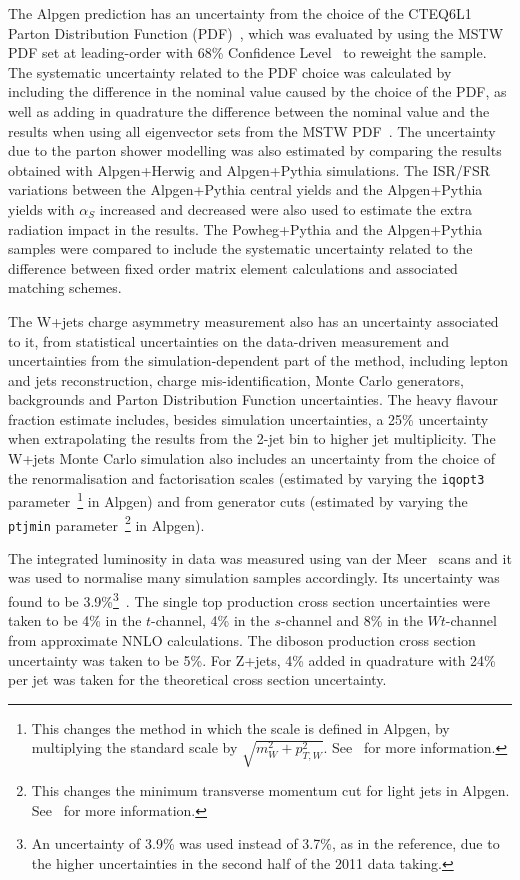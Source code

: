The Alpgen \ttbar prediction has an uncertainty from the choice of the CTEQ6L1 Parton Distribution Function (PDF)~\cite{cteq6}, which was
evaluated by using the MSTW PDF set at leading-order with 68\% Confidence Level~\cite{mstw,pdflhc}
to reweight the \ttbar sample. The systematic uncertainty related to the PDF choice was calculated by
including the difference in the nominal value caused by the choice of the PDF, as well as adding in quadrature the difference between the nominal value and the
results when using all eigenvector sets from the MSTW PDF~\cite{pdflhc}. The uncertainty due to the parton shower modelling was also estimated by comparing the
results obtained with Alpgen+Herwig and Alpgen+Pythia \ttbar simulations. The ISR/FSR variations between the Alpgen+Pythia central yields and the
Alpgen+Pythia yields with $\alpha_S$ increased and
decreased were also used to estimate the extra radiation impact in the results.
The Powheg+Pythia and the Alpgen+Pythia \ttbar samples were compared to include the systematic uncertainty related to the difference
between fixed order matrix element calculations and associated matching schemes.

The W+jets charge asymmetry measurement also has an uncertainty associated to it, from statistical uncertainties on the data-driven measurement and uncertainties
from the simulation-dependent part of the method, including lepton and jets reconstruction, charge mis-identification, Monte Carlo generators, backgrounds and
Parton Distribution Function uncertainties. The heavy flavour fraction estimate includes, besides simulation uncertainties, a 25\% uncertainty when extrapolating the results
from the 2-jet bin to higher jet multiplicity. The W+jets Monte Carlo simulation also includes an uncertainty from the choice of the renormalisation and factorisation scales
(estimated by varying the \texttt{iqopt3} parameter~\footnote{This changes the method in which the scale is defined in Alpgen, by multiplying the standard scale by $\sqrt{m_W^2 + p_{T,W}^2}$. See~\cite{alpgen} for more information.} in Alpgen) and from generator cuts (estimated by varying the \texttt{ptjmin} parameter~\footnote{This changes the minimum transverse momentum cut for light jets in Alpgen. See~\cite{alpgen} for more information.} in Alpgen).

The integrated luminosity in data was measured using van der Meer~\cite{ttjets_lumi} scans and
it was used to normalise many simulation samples accordingly. Its uncertainty was found
to be 3.9\%\footnote{An uncertainty of 3.9\% was used instead of 3.7\%, as in the reference, due to the higher uncertainties in the second half of the 2011 data taking.}~\cite{ttjets_lumi}.
The single top production cross section uncertainties were taken to be 4\% in the $t$-channel, 4\% in the $s$-channel and 8\% in the $Wt$-channel from approximate NNLO calculations.
The diboson production cross section uncertainty was taken to be 5\%. For Z+jets, 4\% added in quadrature with 24\% per jet was taken for the theoretical
cross section uncertainty.

